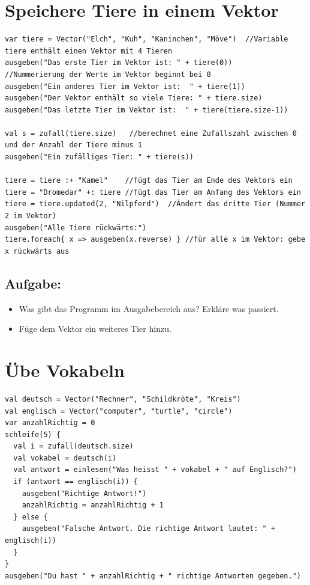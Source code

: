 \chapter{Speichere Tiere in einem Vektor}
\begin{lstlisting}[basicstyle={\ttfamily\fontsize{14}{17}\selectfont},numbers=none]
var tiere = Vector("Elch", "Kuh", "Kaninchen", "Möve")  //Variable tiere enthält einen Vektor mit 4 Tieren
ausgeben("Das erste Tier im Vektor ist: " + tiere(0))     //Nummerierung der Werte im Vektor beginnt bei 0
ausgeben("Ein anderes Tier im Vektor ist:  " + tiere(1))
ausgeben("Der Vektor enthält so viele Tiere: " + tiere.size)
ausgeben("Das letzte Tier im Vektor ist:  " + tiere(tiere.size-1))

val s = zufall(tiere.size)   //berechnet eine Zufallszahl zwischen 0 und der Anzahl der Tiere minus 1
ausgeben("Ein zufälliges Tier: " + tiere(s))

tiere = tiere :+ "Kamel"    //fügt das Tier am Ende des Vektors ein
tiere = "Dromedar" +: tiere //fügt das Tier am Anfang des Vektors ein
tiere = tiere.updated(2, "Nilpferd")  //Ändert das dritte Tier (Nummer 2 im Vektor)
ausgeben("Alle Tiere rückwärts:")
tiere.foreach{ x => ausgeben(x.reverse) } //für alle x im Vektor: gebe x rückwärts aus
\end{lstlisting}
        
\section*{\color{BrickRed}Aufgabe:}


\begin{itemize}

\item {Was gibt das Programm im Ausgabebereich aus? Erkläre was passiert.}
\item {Füge dem Vektor ein weiteres Tier hinzu.}

\end{itemize}


\chapter{Übe Vokabeln}
\begin{lstlisting}[basicstyle={\ttfamily\fontsize{14}{17}\selectfont},numbers=none]
val deutsch = Vector("Rechner", "Schildkröte", "Kreis")
val englisch = Vector("computer", "turtle", "circle")
var anzahlRichtig = 0
schleife(5) {
  val i = zufall(deutsch.size)
  val vokabel = deutsch(i)
  val antwort = einlesen("Was heisst " + vokabel + " auf Englisch?")
  if (antwort == englisch(i)) {
    ausgeben("Richtige Antwort!")
    anzahlRichtig = anzahlRichtig + 1
  } else {
    ausgeben("Falsche Antwort. Die richtige Antwort lautet: " + englisch(i))
  }
}
ausgeben("Du hast " + anzahlRichtig + " richtige Antworten gegeben.")
\end{lstlisting}
        
